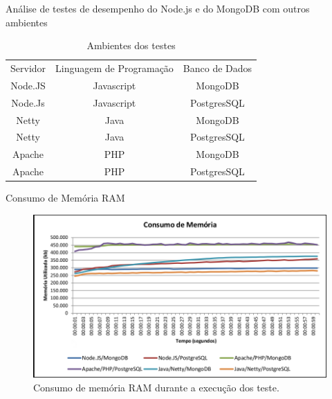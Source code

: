 \documentclass{beamer}
\begin{document}
\begin{frame}{Análise de testes de desempenho do Node.js e do MongoDB
com outros ambientes}
\begin{table}[htb]
\centering
\begin{tabular}{|c|c|c|}
\cline{1-3}
Servidor & Linguagem de Programação & Banco de Dados \\ \cline{1-3}
Node.JS  & Javascript               & MongoDB        \\ \cline{1-3}
Node.Js  & Javascript               & PostgresSQL    \\ \cline{1-3}
Netty    & Java                     & MongoDB        \\ \cline{1-3}
Netty    & Java                     & PostgresSQL    \\ \cline{1-3}
Apache   & PHP                      & MongoDB        \\ \cline{1-3}
Apache   & PHP                      & PostgresSQL    \\ \cline{1-3}
\end{tabular}
\caption{Ambientes dos testes}
\label{fig: ap_amb_testes}
\end{table}
\end{frame}

\begin{frame}{Consumo de Memória RAM}
\begin{figure}[hbt]
  \centering
  \includegraphics[scale=0.35]{../images/graf_memoria.png}
  \caption{ Consumo de memória RAM durante a execução dos teste.}
  \label{fig: consumo_ram}
  \end{figure}
\end{frame}
\end{document}
